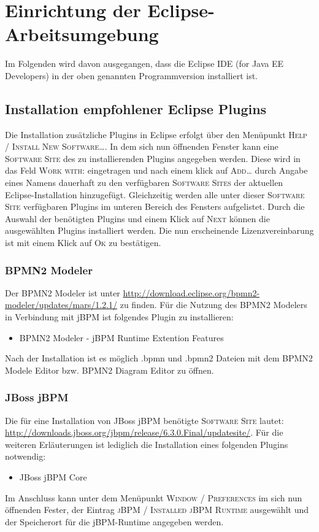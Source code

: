 \section{Einrichtung der Eclipse-Arbeitsumgebung}
Im Folgenden wird davon ausgegangen, dass die Eclipse IDE (for Java EE Developers) in der oben genannten Programmversion installiert ist.

\subsection{Installation empfohlener Eclipse Plugins}
Die Installation zusätzliche Plugins in Eclipse erfolgt über den Menüpunkt \textsc{Help / Install New Software\ldots}. In dem sich nun öffnenden Fenster kann eine \textsc{Software Site} des zu installierenden Plugins angegeben werden. Diese wird in das Feld \textsc{Work with:} eingetragen und nach einem klick auf \textsc{Add\ldots} durch Angabe eines Namens dauerhaft zu den verfügbaren \textsc{Software Sites} der aktuellen Eclipse-Installation hinzugefügt. Gleichzeitig werden alle unter dieser \textsc{Software Site} verfügbaren Plugins im unteren Bereich des Fensters aufgelistet. Durch die Auswahl der benötigten Plugins und einem Klick auf \textsc{Next} können die ausgewählten Plugins installiert werden. Die nun erscheinende Lizenzvereinbarung ist mit einem Klick auf \textsc{Ok} zu bestätigen.

\subsubsection{BPMN2 Modeler}
Der BPMN2 Modeler ist unter \url{http://download.eclipse.org/bpmn2-modeler/updates/mars/1.2.1/} zu finden. Für die Nutzung des BPMN2 Modelers in Verbindung mit jBPM ist folgendes Plugin zu installieren:
\begin{itemize}\renewcommand{\labelitemi}{\itemizecheck}
	\item BPMN2 Modeler - jBPM Runtime Extention Features
\end{itemize}
Nach der Installation ist es möglich {\ttfamily.bpmn} und {\ttfamily.bpmn2} Dateien mit dem BPMN2 Modele Editor bzw. BPMN2 Diagram Editor zu öffnen.

\subsubsection{JBoss jBPM}
Die für eine Installation von JBoss jBPM benötigte \textsc{Software Site} lautet: \url{http://downloads.jboss.org/jbpm/release/6.3.0.Final/updatesite/}. Für die weiteren Erläuterungen ist lediglich die Installation eines folgenden Plugins notwendig:
\begin{itemize}\renewcommand{\labelitemi}{\itemizecheck}
	\item JBoss jBPM Core
\end{itemize}
Im Anschluss kann unter dem Menüpunkt \textsc{Window / Preferences} im sich nun öffnenden Fester, der Eintrag \textsc{jBPM / Installed jBPM Runtime} ausgewählt und der Speicherort für die jBPM-Runtime angegeben werden.

